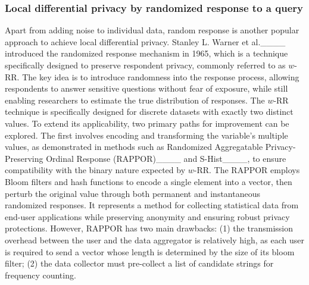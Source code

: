 \subsubsection{Local differential privacy by randomized response to a query}
Apart from adding noise to individual data, random response is another popular approach to achieve local differential privacy. Stanley L. Warner et al.____ introduced the randomized response mechanism in 1965, which is a technique specifically designed to preserve respondent privacy, commonly referred to as $w$-RR. The key idea is to introduce randomness into the response process, allowing respondents to answer sensitive questions without fear of exposure, while still enabling researchers to estimate the true distribution of responses.
The $w$-RR technique is specifically designed for discrete datasets with exactly two distinct values. 
To extend its applicability, two primary paths for improvement can be explored. The first involves encoding and transforming the variable's multiple values, as demonstrated in methods such as Randomized Aggregatable Privacy-Preserving Ordinal Response (RAPPOR)____ and S-Hist____, to ensure compatibility with the binary nature expected by $w$-RR.
The RAPPOR employs Bloom filters and hash functions to encode a single element into a vector, then perturb the original value through both permanent and instantaneous randomized responses. It represents a method for collecting statistical data from end-user applications while preserving anonymity and ensuring robust privacy protections. 
However, RAPPOR has two main drawbacks: (1) the transmission overhead between the user and the data aggregator is relatively high, as each user is required to send a vector whose length is determined by the size of its bloom filter; (2) the data collector must pre-collect a list of candidate strings for frequency counting. 

